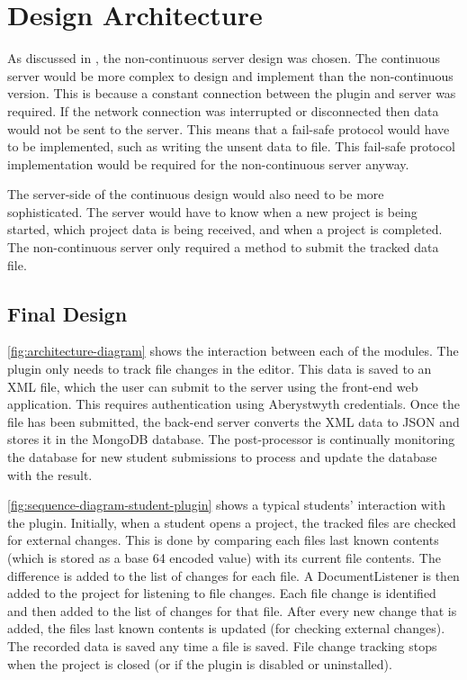 \chapter{Design Architecture}
\label{chp:design}
As discussed in , the non-continuous server design was chosen. The continuous server would be more complex to design and implement than the non-continuous version. This is because a constant connection between the plugin and server was required. If the network connection was interrupted or disconnected then data would not be sent to the server. This means that a fail-safe protocol would have to be implemented, such as writing the unsent data to file. This fail-safe protocol implementation would be required for the non-continuous server anyway.

The server-side of the continuous design would also need to be more sophisticated. The server would have to know when a new project is being started, which project data is being received, and when a project is completed. The non-continuous server only required a method to submit the tracked data file.

\section{Final Design}
\autoref{fig:architecture-diagram} shows the interaction between each of the modules. The plugin only needs to track file changes in the editor. This data is saved to an XML file, which the user can submit to the server using the front-end web application. This requires authentication using Aberystwyth credentials. Once the file has been submitted, the back-end server converts the XML data to JSON and stores it in the MongoDB database. The post-processor is continually monitoring the database for new student submissions to process and update the database with the result.

\autoref{fig:sequence-diagram-student-plugin} shows a typical students' interaction with the plugin. Initially, when a student opens a project, the tracked files are checked for external changes. This is done by comparing each files last known contents (which is stored as a base 64 encoded value) with its current file contents. The difference is added to the list of changes for each file. A DocumentListener is then added to the project for listening to file changes. Each file change is identified and then added to the list of changes for that file. After every new change that is added, the files last known contents is updated (for checking external changes). The recorded data is saved any time a file is saved. File change tracking stops when the project is closed (or if the plugin is disabled or uninstalled).

